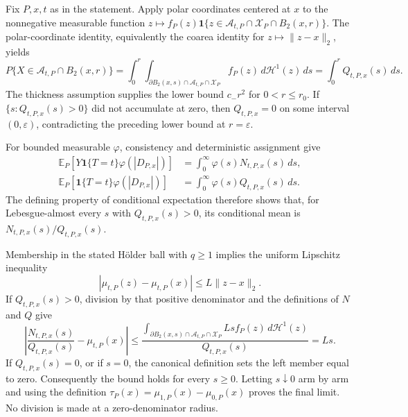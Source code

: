Fix \(P,x,t\) as in the statement.  Apply polar coordinates centered at \(x\) to the nonnegative measurable function
\(z\mapsto f_P(z)\mathbf 1\{z\in\mathcal A_{t,P}\cap\mathcal X_P\cap B_2(x,r)\}\).  The polar-coordinate identity, equivalently the coarea identity for \(z\mapsto\lVert z-x\rVert_2\), yields
\[
 P\{X\in\mathcal A_{t,P}\cap B_2(x,r)\}
 =\int_0^r\int_{\partial B_2(x,s)\cap\mathcal A_{t,P}\cap\mathcal X_P}f_P(z)\,d\mathcal H^1(z)\,ds
 =\int_0^rQ_{t,P,x}(s)\,ds.
\]
The thickness assumption supplies the lower bound \(c_-r^2\) for \(0<r\leq r_0\).  If \(\{s:Q_{t,P,x}(s)>0\}\) did not accumulate at zero, then \(Q_{t,P,x}=0\) on some interval \((0,\varepsilon)\), contradicting the preceding lower bound at \(r=\varepsilon\).

For bounded measurable \(\varphi\), consistency and deterministic assignment give
\[
\begin{aligned}
 \mathbb E_P\!\left[Y\mathbf 1\{T=t\}\varphi(|D_{P,x}|)\right]
 &=\int_0^\infty \varphi(s)N_{t,P,x}(s)\,ds,\\
 \mathbb E_P\!\left[\mathbf 1\{T=t\}\varphi(|D_{P,x}|)\right]
 &=\int_0^\infty \varphi(s)Q_{t,P,x}(s)\,ds.
\end{aligned}
\]
The defining property of conditional expectation therefore shows that, for Lebesgue-almost every \(s\) with \(Q_{t,P,x}(s)>0\), its conditional mean is \(N_{t,P,x}(s)/Q_{t,P,x}(s)\).

Membership in the stated H\"older ball with \(q\geq1\) implies the uniform Lipschitz inequality
\[
 |\mu_{t,P}(z)-\mu_{t,P}(x)|\leq L\lVert z-x\rVert_2.
\]
If \(Q_{t,P,x}(s)>0\), division by that positive denominator and the definitions of \(N\) and \(Q\) give
\[
 \left|\frac{N_{t,P,x}(s)}{Q_{t,P,x}(s)}-\mu_{t,P}(x)\right|
 \leq\frac{\int_{\partial B_2(x,s)\cap\mathcal A_{t,P}\cap\mathcal X_P}Ls f_P(z)\,d\mathcal H^1(z)}{Q_{t,P,x}(s)}
 =Ls.
\]
If \(Q_{t,P,x}(s)=0\), or if \(s=0\), the canonical definition sets the left member equal to zero.  Consequently the bound holds for every \(s\geq0\).  Letting \(s\downarrow0\) arm by arm and using the definition \(\tau_P(x)=\mu_{1,P}(x)-\mu_{0,P}(x)\) proves the final limit.  No division is made at a zero-denominator radius.